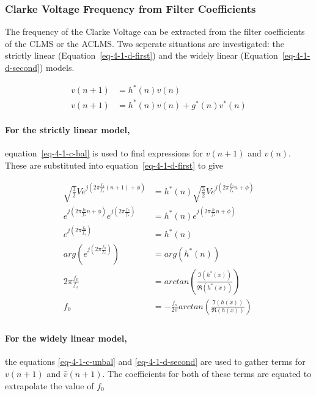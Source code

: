 \documentclass[main.tex]{subfiles}
\begin{document}
\subsubsection{Clarke Voltage Frequency from Filter Coefficients}


The frequency of the Clarke Voltage can be extracted from the filter coefficients of the CLMS or the ACLMS. Two seperate situations are investigated: the strictly linear (Equation~\ref{eq-4-1-d-first}) and the widely linear (Equation~\ref{eq-4-1-d-second}) models.

\begin{align}
v(n+1) &= h^*(n)v(n) \label{eq-4-1-d-first}\\
v(n+1) &= h^*(n)v(n) + g^*(n)v^*(n) \label{eq-4-1-d-second}
\end{align}

\paragraph{For the strictly linear model,} equation~\ref{eq-4-1-c-bal} is used to find expressions for $v(n+1)$ and $v(n)$. These are substituted into equation~\ref{eq-4-1-d-first} to give

\begin{align*}
\sqrt{\frac{3}{2}} V e^{j(2 \pi \frac{f_0}{f_s}(n+1) + \phi)} &= h^*(n)\sqrt{\frac{3}{2}} V e^{j(2 \pi \frac{f_0}{f_s}n + \phi)}\\
e^{j(2 \pi \frac{f_0}{f_s}n + \phi)}e^{j(2 \pi \frac{f_0}{f_s})} &= h^*(n) e^{j(2 \pi \frac{f_0}{f_s}n + \phi)}\\
e^{j(2 \pi \frac{f_0}{f_s})} &= h^*(n) \\
arg(e^{j(2 \pi \frac{f_0}{f_s})}) &= arg(h^*(n)) \\
2 \pi \frac{f_0}{f_s} &= arctan\left(\frac{\Im(h^*(x))}{\Re(h^*(x))}\right) \\
f_0 &= - \frac{f_s}{2\pi} arctan\left(\frac{\Im(h(x))}{\Re(h(x))}\right) \\
\end{align*}

\paragraph{For the widely linear model,} the equations \ref{eq-4-1-c-unbal} and \ref{eq-4-1-d-second} are used to gather terms for $v(n+1)$ and $\hat{v}(n+1)$. The coefficients for both of these terms are equated to extrapolate the value of $f_0$ \cite{Xia2012} 
\end{document}

